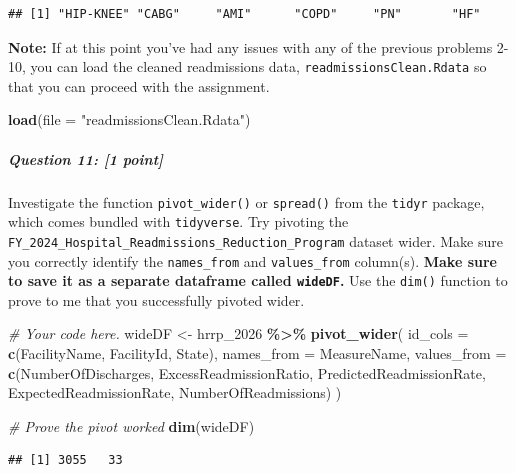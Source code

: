 \documentclass[
]{article}
\newenvironment{Shaded}{\begin{snugshade}}{\end{snugshade}}
\newcommand{\AttributeTok}[1]{\textcolor[rgb]{0.13,0.29,0.53}{#1}}
\newcommand{\CommentTok}[1]{\textcolor[rgb]{0.56,0.35,0.01}{\textit{#1}}}
\newcommand{\FunctionTok}[1]{\textcolor[rgb]{0.13,0.29,0.53}{\textbf{#1}}}
\newcommand{\NormalTok}[1]{#1}
\newcommand{\OtherTok}[1]{\textcolor[rgb]{0.56,0.35,0.01}{#1}}
\newcommand{\SpecialCharTok}[1]{\textcolor[rgb]{0.81,0.36,0.00}{\textbf{#1}}}
\newcommand{\StringTok}[1]{\textcolor[rgb]{0.31,0.60,0.02}{#1}}
\begin{document}
\begin{verbatim}
## [1] "HIP-KNEE" "CABG"     "AMI"      "COPD"     "PN"       "HF"
\end{verbatim}

\textbf{Note:} If at this point you've had any issues with any of the
previous problems 2-10, you can load the cleaned readmissions data,
\texttt{readmissionsClean.Rdata} so that you can proceed with the
assignment.

\begin{Shaded}
\begin{Highlighting}[]
\FunctionTok{load}\NormalTok{(}\AttributeTok{file =} \StringTok{"readmissionsClean.Rdata"}\NormalTok{)}
\end{Highlighting}
\end{Shaded}

\subparagraph{\texorpdfstring{\textbf{Question 11}: {[}1
point{]}}{Question 11: {[}1 point{]}}}\label{question-11-1-point}

Investigate the function \texttt{pivot\_wider()} or \texttt{spread()}
from the \texttt{tidyr} package, which comes bundled with
\texttt{tidyverse}. Try pivoting the
\texttt{FY\_2024\_Hospital\_Readmissions\_Reduction\_Program} dataset
wider. Make sure you correctly identify the \texttt{names\_from} and
\texttt{values\_from} column(s). \textbf{Make sure to save it as a
separate dataframe called \texttt{wideDF}.} Use the \texttt{dim()}
function to prove to me that you successfully pivoted wider.

\begin{Shaded}
\begin{Highlighting}[]
\CommentTok{\# Your code here.}
\NormalTok{wideDF }\OtherTok{\textless{}{-}}\NormalTok{ hrrp\_2026 }\SpecialCharTok{\%\textgreater{}\%}
  \FunctionTok{pivot\_wider}\NormalTok{(}
    \AttributeTok{id\_cols =} \FunctionTok{c}\NormalTok{(FacilityName, FacilityId, State),}
    \AttributeTok{names\_from =}\NormalTok{ MeasureName,}
    \AttributeTok{values\_from =} \FunctionTok{c}\NormalTok{(NumberOfDischarges, ExcessReadmissionRatio,}
\NormalTok{                    PredictedReadmissionRate, ExpectedReadmissionRate,}
\NormalTok{                    NumberOfReadmissions)}
\NormalTok{  )}

\CommentTok{\# Prove the pivot worked}
\FunctionTok{dim}\NormalTok{(wideDF)}
\end{Highlighting}
\end{Shaded}

\begin{verbatim}
## [1] 3055   33
\end{verbatim}
\end{document}
